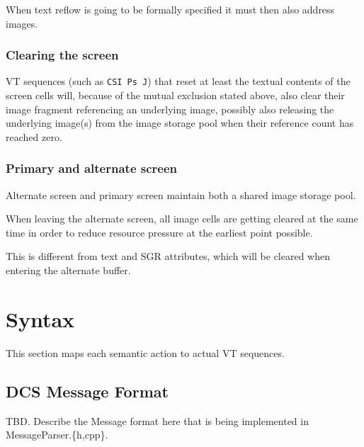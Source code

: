 \documentclass[a4paper]{article}
\newcommand{\code}[1]{\colorbox{light-gray}{\texttt{#1}}}
\begin{document}
When text reflow is going to be formally specified it must then also address images.

\subsubsection*{Clearing the screen}

VT sequences (such as \code{CSI Ps J}) that reset at least the textual contents
of the screen cells will, because of the mutual exclusion stated above, also
clear their image fragment referencing an underlying image,
possibly also releasing the underlying image(s) from the image storage pool
when their reference count has reached zero.

\subsubsection*{Primary and alternate screen}

Alternate screen and primary screen maintain both a shared image storage pool.

When leaving the alternate screen, all image cells are getting cleared at the
same time in order to reduce resource pressure at the earliest point possible.

This is different from text and SGR attributes, which will be cleared when
entering the alternate buffer.


\section{Syntax} %

This section maps each semantic action to actual VT sequences.

\subsection{DCS Message Format}


TBD. Describe the Message format here that is being implemented in MessageParser.\{h,cpp\}.
\end{document}
